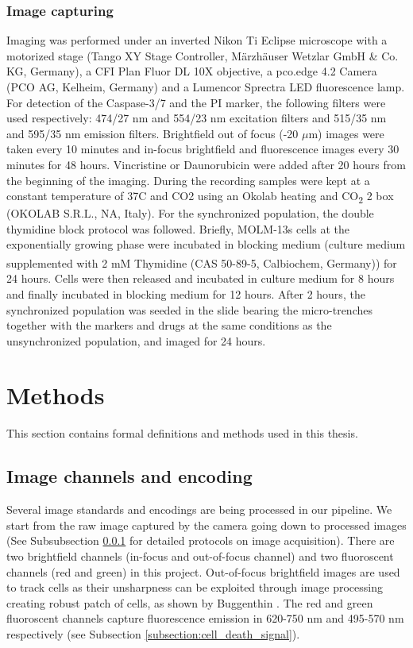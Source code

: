 \documentclass[pdftex,12pt,a4paper]{report}
\begin{document}
\subsubsection{Image capturing}
\label{subsubsection:image_capturing}

Imaging was performed under an inverted Nikon Ti Eclipse microscope with a motorized stage (Tango XY Stage Controller, M\"arzh\"auser Wetzlar GmbH \& Co. KG, Germany), a CFI Plan Fluor DL 10X objective, a pco.edge 4.2 Camera (PCO AG, Kelheim, Germany) and a Lumencor Sprectra LED fluorescence lamp. For detection of the Caspase-3/7 and the PI marker, the following filters were used respectively: 474/27 nm and 554/23 nm excitation filters and 515/35 nm and 595/35 nm emission filters. Brightfield out of focus (-20 $\mu$m) images were taken every 10 minutes and in-focus  brightfield and fluorescence images every 30 minutes for 48 hours. Vincristine or Daunorubicin were added after 20 hours from the beginning of the imaging. During the recording samples were kept at a constant temperature of 37\degree C and CO2 using an Okolab heating and CO\textsubscript{2} 2 box (OKOLAB S.R.L., NA, Italy). For the synchronized population, the double thymidine block protocol was followed. Briefly, MOLM-13s cells at the exponentially growing phase were incubated in blocking medium (culture medium supplemented with 2 mM Thymidine (CAS 50-89-5, Calbiochem\textsuperscript{\textregistered}, Germany)) for 24 hours. Cells were then released and incubated in culture medium for 8 hours and finally incubated in blocking medium for 12 hours. After 2 hours, the synchronized population was seeded in the slide bearing the micro-trenches together with the markers and drugs at the same conditions as the unsynchronized population, and imaged for 24 hours.


\section{Methods}

This section contains formal definitions and methods used in this thesis.

\subsection{Image channels and encoding}
\label{subsection:image_encoding}

Several image standards and encodings are being processed in our pipeline. We start from the raw image captured by the camera going down to processed images (See Subsubsection \ref{subsubsection:image_capturing} for detailed protocols on image acquisition). There are two brightfield channels (in-focus and out-of-focus channel) and two fluoroscent channels (red and green) in this project. Out-of-focus brightfield images are used to track cells as their unsharpness can be exploited through image processing creating robust patch of cells, as shown by Buggenthin \cite{buggenthin2011computational}. The red and green fluoroscent channels capture fluorescence emission in 620-750 nm and 495-570 nm respectively (see Subsection \ref{subsection:cell_death_signal}).
\end{document}
